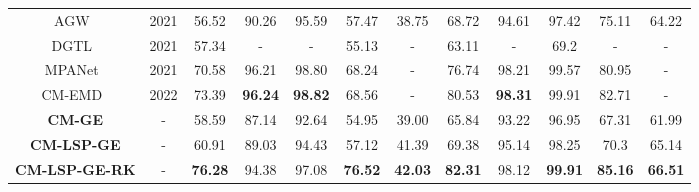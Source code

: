 \documentclass[journal]{IEEEtran}
\begin{document}
\begin{table*}[]
\begin{tabular}{c|c|ccccc|ccccc}
		AGW~\cite{xia2021visible}                       & 2021                  & 56.52                       & 90.26                        & 95.59                        & 57.47                    & 38.75          & 68.72                       & 94.61                        & 97.42                        & 75.11                    & 64.22          \\
		DGTL~\cite{liu2021strong}                     & 2021                  & 57.34                       & -                            & -                            & 55.13                    & -              & 63.11                       & -                            & 69.2                         & -                        & -              \\
		MPANet~\cite{wu2021discover}                    & 2021                  & 70.58                       & 96.21                        & 98.80                        & 68.24                    & -              & 76.74                       & 98.21                        & 99.57                        & 80.95                    & -              \\ \hline
		CM-EMD~\cite{ling2022cross}                   & 2022                  & 73.39                       & \textbf{96.24}               & \textbf{98.82}               & 68.56                    & -              & 80.53                       & \textbf{98.31}               & 99.91                        & 82.71                    & -              \\ \hline
		\textbf{CM-GE}                    & -                     & 58.59                       & 87.14                        & 92.64                        & 54.95                    & 39.00          & 65.84                       & 93.22                        & 96.95                        & 67.31                    & 61.99          \\
		\textbf{CM-LSP-GE}                   & -                     & 60.91                       & 89.03                        & 94.43                        & 57.12                    & 41.39          & 69.38                       & 95.14                        & 98.25                        & 70.3                     & 65.14          \\
		\textbf{CM-LSP-GE-RK}             & -                     & \textbf{76.28}              & 94.38                        & 97.08                        & \textbf{76.52}           & \textbf{42.03} & \textbf{82.31}              & 98.12                        & \textbf{99.91}               & \textbf{85.16}           & \textbf{66.51} \\ \hline
	\end{tabular}
\end{table*}
\end{document}
